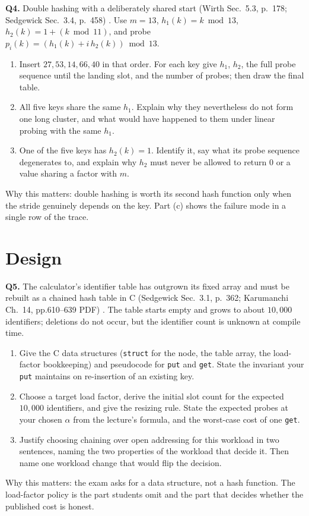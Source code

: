 \documentclass[11pt]{article}
\begin{document}
\textbf{Q4.} Double hashing with a deliberately shared start (Wirth Sec.~5.3, p.~178; Sedgewick Sec.~3.4, p.~458) \cite{Wirth2004_algorithms_data_structures,Sedgewick2011_algorithms}. Use $m = 13$, $h_1(k) = k \bmod 13$, $h_2(k) = 1 + (k \bmod 11)$, and probe $p_i(k) = (h_1(k) + i\,h_2(k)) \bmod 13$.
\begin{enumerate}
  \item[(a)] Insert $27, 53, 14, 66, 40$ in that order. For each key give $h_1$, $h_2$, the full probe sequence until the landing slot, and the number of probes; then draw the final table.
  \item[(b)] All five keys share the same $h_1$. Explain why they nevertheless do not form one long cluster, and what would have happened to them under linear probing with the same $h_1$.
  \item[(c)] One of the five keys has $h_2(k) = 1$. Identify it, say what its probe sequence degenerates to, and explain why $h_2$ must never be allowed to return $0$ or a value sharing a factor with $m$.
\end{enumerate}
Why this matters: double hashing is worth its second hash function only when the stride genuinely depends on the key. Part (c) shows the failure mode in a single row of the trace.

\section{Design}

\textbf{Q5.} The calculator's identifier table has outgrown its fixed array and must be rebuilt as a chained hash table in C (Sedgewick Sec.~3.1, p.~362; Karumanchi Ch.~14, pp.610--639 PDF) \cite{Sedgewick2011_algorithms,Karumanchi2017_data_structures_algorithms_made_easy}. The table starts empty and grows to about $10{,}000$ identifiers; deletions do not occur, but the identifier count is unknown at compile time.
\begin{enumerate}
  \item[(a)] Give the C data structures (\texttt{struct} for the node, the table array, the load-factor bookkeeping) and pseudocode for \texttt{put} and \texttt{get}. State the invariant your \texttt{put} maintains on re-insertion of an existing key.
  \item[(b)] Choose a target load factor, derive the initial slot count for the expected $10{,}000$ identifiers, and give the resizing rule. State the expected probes at your chosen $\alpha$ from the lecture's formula, and the worst-case cost of one \texttt{get}.
  \item[(c)] Justify choosing chaining over open addressing for this workload in two sentences, naming the two properties of the workload that decide it. Then name one workload change that would flip the decision.
\end{enumerate}
Why this matters: the exam asks for a data structure, not a hash function. The load-factor policy is the part students omit and the part that decides whether the published cost is honest.
\end{document}
